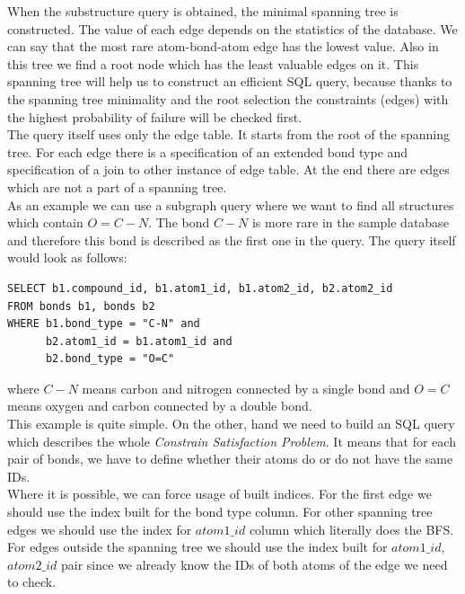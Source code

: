 When the substructure query is obtained, the minimal spanning tree is constructed. The value of each edge depends on the statistics of the database. We can say that the most rare atom-bond-atom edge has the lowest value. Also in this tree we find a root node which has the least valuable edges on it. This spanning tree will help us to construct an efficient SQL query, because thanks to the spanning tree minimality and the root selection the constraints (edges) with the highest probability of failure will be checked first.\\

The query itself uses only the edge table. It starts from the root of the spanning tree. For each edge there is a specification of an extended bond type and specification of a join to other instance of edge table. At the end there are edges which are not a part of a spanning tree.\\

As an example we can use a subgraph query where we want to find all structures which contain $ O=C-N $. The bond $ C-N $ is more rare in the sample database and therefore this bond is described as the first one in the query. The query itself would look as follows:


\begin{verbatim}
SELECT b1.compound_id, b1.atom1_id, b1.atom2_id, b2.atom2_id
FROM bonds b1, bonds b2
WHERE b1.bond_type = "C-N" and
      b2.atom1_id = b1.atom1_id and 
      b2.bond_type = "O=C"
\end{verbatim}

\noindent where $ C-N $ means carbon and nitrogen connected by a single bond and $ O=C $ means oxygen and carbon connected by a double bond.\\

This example is quite simple. On the other, hand we need to build an SQL query which describes the whole \textit{Constrain Satisfaction Problem}. It means that for each pair of bonds, we have to define whether their atoms do or do not have the same IDs.\\

Where it is possible, we can force usage of built indices. For the first edge we should use the index built for the bond type column. For other spanning tree edges we should use the index for $ atom1\_id $ column which literally does the BFS. For edges outside the spanning tree we should use the index built for $ atom1\_id $, $ atom2\_id $ pair since we already know the IDs of both atoms of the edge we need to check.


